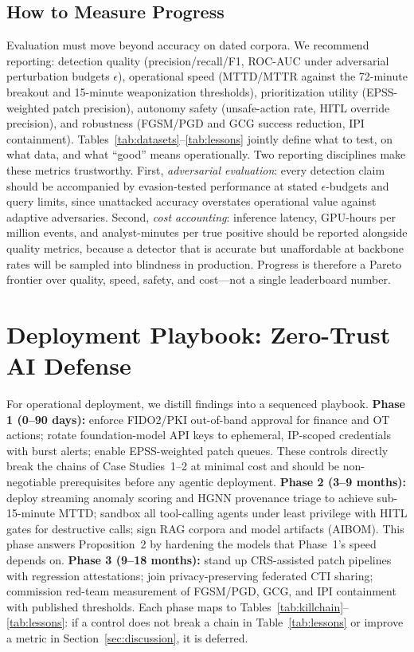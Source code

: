 \documentclass[conference,10pt,twocolumn,a4paper]{IEEEtran}
\begin{document}
\subsection{How to Measure Progress}
Evaluation must move beyond accuracy on dated corpora. We recommend reporting: detection quality (precision/recall/F1, ROC-AUC under adversarial perturbation budgets $\epsilon$), operational speed (MTTD/MTTR against the 72-minute breakout and 15-minute weaponization thresholds), prioritization utility (EPSS-weighted patch precision), autonomy safety (unsafe-action rate, HITL override precision), and robustness (FGSM/PGD and GCG success reduction, IPI containment). Tables~\ref{tab:datasets}--\ref{tab:lessons} jointly define what to test, on what data, and what ``good'' means operationally. Two reporting disciplines make these metrics trustworthy. First, \emph{adversarial evaluation}: every detection claim should be accompanied by evasion-tested performance at stated $\epsilon$-budgets and query limits, since unattacked accuracy overstates operational value against adaptive adversaries. Second, \emph{cost accounting}: inference latency, GPU-hours per million events, and analyst-minutes per true positive should be reported alongside quality metrics, because a detector that is accurate but unaffordable at backbone rates will be sampled into blindness in production. Progress is therefore a Pareto frontier over quality, speed, safety, and cost---not a single leaderboard number.

\section{Deployment Playbook: Zero-Trust AI Defense}
\label{sec:playbook}
For operational deployment, we distill findings into a sequenced playbook. \textbf{Phase 1 (0--90 days):} enforce FIDO2/PKI out-of-band approval for finance and OT actions; rotate foundation-model API keys to ephemeral, IP-scoped credentials with burst alerts; enable EPSS-weighted patch queues. These controls directly break the chains of Case Studies~1--2 at minimal cost and should be non-negotiable prerequisites before any agentic deployment. \textbf{Phase 2 (3--9 months):} deploy streaming anomaly scoring and HGNN provenance triage to achieve sub-15-minute MTTD; sandbox all tool-calling agents under least privilege with HITL gates for destructive calls; sign RAG corpora and model artifacts (AIBOM). This phase answers Proposition~2 by hardening the models that Phase~1's speed depends on. \textbf{Phase 3 (9--18 months):} stand up CRS-assisted patch pipelines with regression attestations; join privacy-preserving federated CTI sharing; commission red-team measurement of FGSM/PGD, GCG, and IPI containment with published thresholds. Each phase maps to Tables~\ref{tab:killchain}--\ref{tab:lessons}: if a control does not break a chain in Table~\ref{tab:lessons} or improve a metric in Section~\ref{sec:discussion}, it is deferred.
\end{document}

